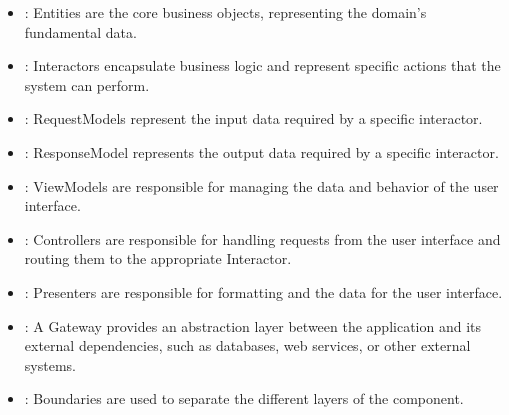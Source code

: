 \begin{itemize}
    \item {}: Entities are the core business objects, representing the
    domain's fundamental data.
    \item {}: Interactors encapsulate business logic and represent
    specific actions that the system can perform.
    \item {}: RequestModels represent the input data required by a
    specific interactor.
    \item {}: ResponseModel represents the output data
    required by a specific interactor.
    \item {}: ViewModels are responsible for managing the data and
    behavior of the user interface.
    \item {}: Controllers are responsible for handling requests from the user
    interface and routing them to the appropriate Interactor.
    \item {}: Presenters are responsible for formatting and the data for
    the user interface.
    \item {}: A Gateway provides an abstraction layer between the
    application and its external dependencies, such as databases, web services, or other
    external systems.
    \item {}: Boundaries are used to separate the different layers of
    the component.
\end{itemize}
